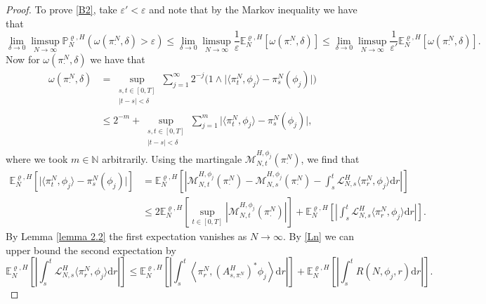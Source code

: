 \documentclass[10pt,a4paper]{amsart}
\newcommand{\E}{\mathbb{E}}
\newcommand{\dd}{\mathrm{d}}
\newcommand{\nn}{\nonumber}
\newcommand{\p}{\mathbb{P}}
\begin{document}
\begin{proof}
To prove \ref{B2}, take $\varepsilon'<\varepsilon$ and  note  that by the Markov inequality we have that 
    \begin{equation}
        \lim_{\delta\to0}\limsup_{N\to\infty} \p^{\varrho,H}_N(\omega(\pi^N_{\cdot},\delta) > \varepsilon) \leq \lim_{\delta\to0}\limsup_{N\to\infty}\frac{1}{\varepsilon} \E^{\varrho,H}_N\left[\omega(\pi^N_{\cdot},\delta)\right] \leq \lim_{\delta\to0}\limsup_{N\to\infty}\frac{1}{\varepsilon'} \E^{\varrho,H}_N\left[\omega(\pi^N_{\cdot},\delta)\right].
    \end{equation}
Now for $\omega(\pi^N_{\cdot},\delta)$ we have that 
    \begin{align}
        \omega(\pi^N_{\cdot},\delta) 
        &= \sup_{\substack{s,t\in[0,T]\\|t-s|<\delta}}\sum_{j=1}^\infty 2^{-j}\Big(1\wedge \big|\langle \pi^N_{t},\phi_j\rangle - \pi^N_{s}(\phi_j)\big|\Big)\nn\\
        &\leq 2^{-m} + \sup_{\substack{s,t\in[0,T]\\|t-s|<\delta}}\sum_{j=1}^m \big|\langle \pi^N_{t},\phi_j\rangle - \pi^N_{s}(\phi_j)\big|,
    \end{align}
where we took $m\in\mathbb{N}$ arbitrarily. Using the martingale $\mathscr{M}_{N,t}^{H,\phi_j}(\pi^N_{\cdot})$, we find that 
    \begin{align}
        \E^{\varrho,H}_N\left[\big|\langle \pi^N_{t},\phi_j\rangle - \pi^N_{s}(\phi_j)\big|\right] 
        &= \E^{\varrho,H}_N\left[\left|\mathscr{M}_{N,t}^{H,\phi_j}(\pi^N_{\cdot}) - \mathscr{M}_{N,s}^{H,\phi_j}(\pi^N_{\cdot}) - \int_s^t \mathscr{L}^H_{N,s}\langle \pi^N_{r},\phi_j\rangle \dd r \right|\right]\nn\\
    &\leq 2\E^{\varrho,H}_N\left[\sup_{t\in[0,T]} \left|\mathscr{M}_{N,t}^{H,\phi_j}(\pi^N_{\cdot})\right|\right] + \E^{\varrho,H}_N\left[\left|\int_s^t \mathscr{L}^H_{N,s}\langle \pi^N_{r},\phi_j\rangle\dd r\right|\right].
    \end{align}
By Lemma \ref{lemma 2.2} the first expectation vanishes as $N\to\infty$. By \eqref{Ln} we can upper bound the second expectation by 
    \begin{equation}
        \E^{\varrho,H}_N\left[\left|\int_s^t \mathscr{L}^H_{N,s}\langle \pi^N_{r},\phi_j\rangle\dd r\right|\right] \leq \E^{\varrho,H}_N\left[\left|\int_s^t\left\langle \pi^N_{r}, \left(\!A^{H}_{s, \pi^N_\cdot}\!\right)^{\!*} \phi_j\right\rangle\dd r\right|\right] + \E^{\varrho,H}_N\left[\left|\int_s^t R(N,\phi_j,r)\dd r\right|\right].
    \end{equation}

\end{proof}
\end{document}
